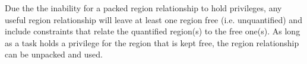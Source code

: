 
Due the the inability for a packed region relationship to hold privileges, any
useful region relationship will leave at least one region free (i.e. unquantified) and include constraints that relate the quantified region(s) to the free one(s).  As long as a task holds a privilege for the region that is kept free, the
region relationship can be unpacked and used.



%
%
